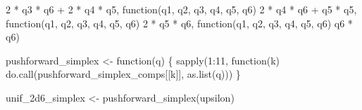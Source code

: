 \documentclass[
  letterpaper,
  DIV=11,
  numbers=noendperiod]{scrartcl}
\newenvironment{Shaded}{\begin{snugshade}}{\end{snugshade}}
\newcommand{\ControlFlowTok}[1]{\textcolor[rgb]{0.00,0.23,0.31}{#1}}
\newcommand{\DecValTok}[1]{\textcolor[rgb]{0.68,0.00,0.00}{#1}}
\newcommand{\FunctionTok}[1]{\textcolor[rgb]{0.28,0.35,0.67}{#1}}
\newcommand{\NormalTok}[1]{\textcolor[rgb]{0.00,0.23,0.31}{#1}}
\newcommand{\OtherTok}[1]{\textcolor[rgb]{0.00,0.23,0.31}{#1}}
\newcommand{\SpecialCharTok}[1]{\textcolor[rgb]{0.37,0.37,0.37}{#1}}
\begin{document}
\begin{Shaded}
\begin{Highlighting}[]
                               \DecValTok{2} \SpecialCharTok{*}\NormalTok{ q3 }\SpecialCharTok{*}\NormalTok{ q6 }\SpecialCharTok{+} \DecValTok{2} \SpecialCharTok{*}\NormalTok{ q4 }\SpecialCharTok{*}\NormalTok{ q5,}
                               \ControlFlowTok{function}\NormalTok{(q1, q2, q3, q4, q5, q6)}
                               \DecValTok{2} \SpecialCharTok{*}\NormalTok{ q4 }\SpecialCharTok{*}\NormalTok{ q6 }\SpecialCharTok{+}\NormalTok{     q5 }\SpecialCharTok{*}\NormalTok{ q5,}
                               \ControlFlowTok{function}\NormalTok{(q1, q2, q3, q4, q5, q6)}
                               \DecValTok{2} \SpecialCharTok{*}\NormalTok{ q5 }\SpecialCharTok{*}\NormalTok{ q6,}
                               \ControlFlowTok{function}\NormalTok{(q1, q2, q3, q4, q5, q6)}
\NormalTok{                                   q6 }\SpecialCharTok{*}\NormalTok{ q6)}

\NormalTok{pushforward\_simplex }\OtherTok{\textless{}{-}} \ControlFlowTok{function}\NormalTok{(q) \{}
  \FunctionTok{sapply}\NormalTok{(}\DecValTok{1}\SpecialCharTok{:}\DecValTok{11}\NormalTok{,}
         \ControlFlowTok{function}\NormalTok{(k) }\FunctionTok{do.call}\NormalTok{(pushforward\_simplex\_comps[[k]], }\FunctionTok{as.list}\NormalTok{(q)))}
\NormalTok{\}}
\end{Highlighting}
\end{Shaded}

\begin{Shaded}
\begin{Highlighting}[]
\NormalTok{unif\_2d6\_simplex }\OtherTok{\textless{}{-}} \FunctionTok{pushforward\_simplex}\NormalTok{(upsilon)}
\end{Highlighting}
\end{Shaded}
\end{document}
